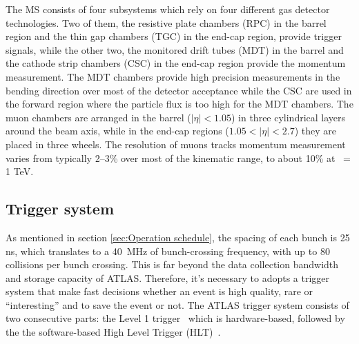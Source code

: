 The MS consists of four subsystems which rely on four different gas detector
technologies. Two of them, the resistive plate chambers (RPC) in the barrel region 
and the thin gap chambers (TGC) in the end-cap region, provide trigger signals, 
while the other two, the monitored drift tubes (MDT) in the barrel and the cathode strip 
chambers (CSC) in the end-cap region provide the momentum measurement. 
The MDT chambers provide high precision measurements in the bending direction over most of the detector
acceptance while the CSC are used in the forward region where the particle flux 
is too high for the MDT	chambers. The muon chambers are arranged in the barrel 
($|\eta| < 1.05$) in three cylindrical layers around the beam axis, 
while in the end-cap regions ($1.05 < |\eta| < 2.7$) they are placed in three wheels.
The resolution of muons tracks momentum measurement varies from typically 2–3\% over
most of the kinematic range, to about 10\% at \pt\ = 1 TeV.  

\subsection{Trigger system}
As mentioned in section \ref{sec:Operation schedule}, the spacing of each bunch
is 25 ns, which translates to a 40~MHz of bunch-crossing frequency, with up to 80
collisions per bunch crossing. This is far beyond the data collection bandwidth and 
storage capacity of ATLAS. 
Therefore, it's necessary to adopts a trigger system that make fast decisions
whether an event is high quality, rare or ``interesting'' and to save the event or not.
The ATLAS trigger system consists of two consecutive parts: the Level 1 trigger~\cite{ATLAS-TDR-12}
which is hardware-based, 
followed by the the software-based High Level Trigger (HLT)~\cite{ATLAS-TDR-16}.

